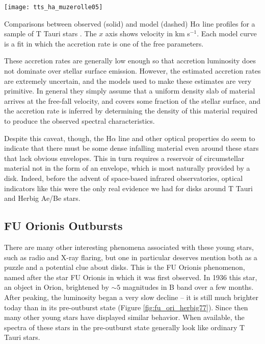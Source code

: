 \begin{marginfigure}
\texttt{[image: tts\_ha\_muzerolle05]}
\caption[H$\alpha$ lines from T Tauri stars compared to models]{
\label{fig:tts_ha_muzerolle05}
Comparisons between observed (solid) and model (dashed) H$\alpha$ line profiles for a sample of T Tauri stars \citep{muzerolle05a}. The $x$ axis shows velocity in km s$^{-1}$. Each model curve is a fit in which the accretion rate is one of the free parameters.
}
\end{marginfigure}

These accretion rates are generally low enough so that accretion luminosity does not dominate over stellar surface emission. However, the estimated accretion rates are extremely uncertain, and the models used to make these estimates are very primitive. In general they simply assume that a uniform density slab of material arrives at the free-fall velocity, and covers some fraction of the stellar surface, and the accretion rate is inferred by determining the density of this material required to produce the observed spectral characteristics.

Despite this caveat, though, the H$\alpha$ line and other optical properties do seem to indicate that there must be some dense infalling material even around these stars that lack obvious envelopes. This in turn requires a reservoir of circumstellar material not in the form of an envelope, which is most naturally provided by a disk. Indeed, before the advent of space-based infrared observatories, optical indicators like this were the only real evidence we had for disks around T Tauri and Herbig Ae/Be stars.

\subsection{FU Orionis Outbursts}

There are many other interesting phenomena associated with these young stars, such as radio and X-ray flaring, but one in particular deserves mention both as a puzzle and a potential clue about disks. This is the FU Orionis phenomenon, named after the star FU Orionis in which it was first observed. In 1936 this star, an object in Orion, brightened by $\sim 5$ magnitudes in B band over a few months. After peaking, the luminosity began a very slow decline -- it is still much brighter today than in its pre-outburst state (Figure \ref{fig:fu_ori_herbig77}). Since then many other young stars have displayed similar behavior. When available, the spectra of these stars in the pre-outburst state generally look like ordinary T Tauri stars.

